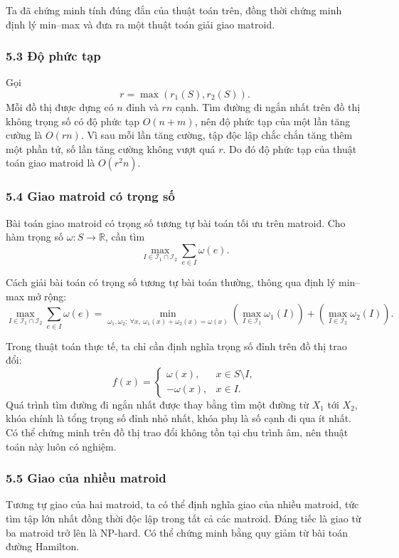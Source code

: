 \documentclass[11pt]{article}
\begin{document}
Ta đã chứng minh tính đúng đắn của thuật toán trên, đồng thời chứng minh định
lý min--max và đưa ra một thuật toán giải giao matroid.

\subsubsection*{5.3 Độ phức tạp}

Gọi
\[
  r=\max(r_1(S),r_2(S)).
\]
Mỗi đồ thị được dựng có \(n\) đỉnh và \(rn\) cạnh. Tìm đường đi ngắn nhất trên
đồ thị không trọng số có độ phức tạp \(O(n+m)\), nên độ phức tạp của một lần
tăng cường là \(O(rn)\). Vì sau mỗi lần tăng cường, tập độc lập chắc chắn tăng
thêm một phần tử, số lần tăng cường không vượt quá \(r\). Do đó độ phức tạp của
thuật toán giao matroid là \(O(r^2n)\).

\subsubsection*{5.4 Giao matroid có trọng số}

Bài toán giao matroid có trọng số tương tự bài toán tối ưu trên matroid. Cho
hàm trọng số \(\omega:S\to\mathbb R\), cần tìm
\[
  \max_{I\in\mathcal I_1\cap\mathcal I_2}\sum_{e\in I}\omega(e).
\]

Cách giải bài toán có trọng số tương tự bài toán thường, thông qua định lý
min--max mở rộng:
\[
  \max_{I\in\mathcal I_1\cap\mathcal I_2}\sum_{e\in I}\omega(e)
  =
  \min_{\omega_1,\omega_2:\ \forall x,\ \omega_1(x)+\omega_2(x)=\omega(x)}
  \left(\max_{I\in\mathcal I_1}\omega_1(I)\right)
  +
  \left(\max_{I\in\mathcal I_2}\omega_2(I)\right).
\]

Trong thuật toán thực tế, ta chỉ cần định nghĩa trọng số đỉnh trên đồ thị trao
đổi:
\[
  f(x)=
  \begin{cases}
    \omega(x), & x\in S\setminus I,\\
    -\omega(x), & x\in I.
  \end{cases}
\]
Quá trình tìm đường đi ngắn nhất được thay bằng tìm một đường từ \(X_1\) tới
\(X_2\), khóa chính là tổng trọng số đỉnh nhỏ nhất, khóa phụ là số cạnh đi qua
ít nhất. Có thể chứng minh trên đồ thị trao đổi không tồn tại chu trình âm, nên
thuật toán này luôn có nghiệm.

\subsubsection*{5.5 Giao của nhiều matroid}

Tương tự giao của hai matroid, ta có thể định nghĩa giao của nhiều matroid, tức
tìm tập lớn nhất đồng thời độc lập trong tất cả các matroid. Đáng tiếc là giao
từ ba matroid trở lên là NP-hard. Có thể chứng minh bằng quy giảm từ bài toán
đường Hamilton.
\end{document}
